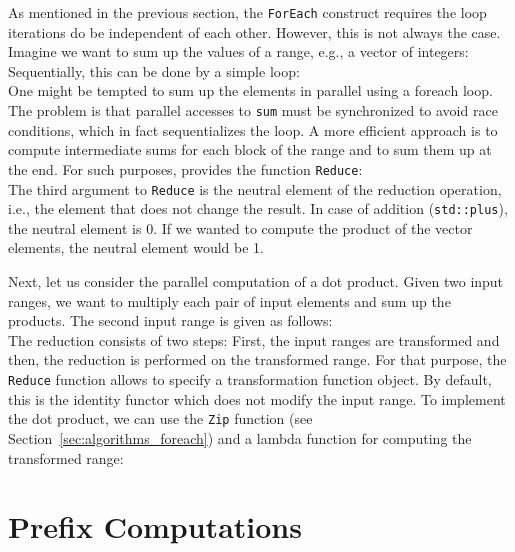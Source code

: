 As mentioned in the previous section, the \lstinline|ForEach| construct requires the loop iterations do be independent of each other. However, this is not always the case. Imagine we want to sum up the values of a range, e.g., a vector of integers:
%
\\
%
Sequentially, this can be done by a simple loop:
%
\\
%
One might be tempted to sum up the elements in parallel using a foreach loop. The problem is that parallel accesses to \lstinline|sum| must be synchronized to avoid race conditions, which in fact sequentializes the loop. A more efficient approach is to compute intermediate sums for each block of the range and to sum them up at the end. For such purposes, {\embb} provides the function \lstinline|Reduce|:
%
\\
%
The third argument to \lstinline|Reduce| is the neutral element of the reduction operation, i.e., the element that does not change the result. In case of addition (\lstinline|std::plus|), the neutral element is 0. If we wanted to compute the product of the vector elements, the neutral element would be 1.

Next, let us consider the parallel computation of a dot product. Given two input ranges, we want to multiply each pair of input elements and sum up the products. The second input range is given as follows:
%
\\
%
The reduction consists of two steps: First, the input ranges are transformed and then, the reduction is performed on the transformed range. For that purpose, the \lstinline|Reduce| function allows to specify a transformation function object. By default, this is the identity functor which does not modify the input range. To implement the dot product, we can use the \lstinline|Zip| function (see Section~\ref{sec:algorithms_foreach}) and a lambda function for computing the transformed range:
%
\\

\section{Prefix Computations}
\label{sec:algorithms_prefix}

